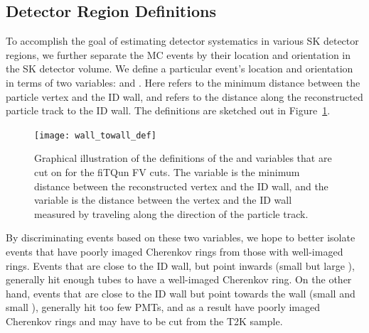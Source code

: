 \subsection{Detector Region Definitions}
\label{subsec:DR}

To accomplish the goal of estimating detector systematics in various SK
detector regions, we further separate the MC events by their location and
orientation in the SK detector volume.  We define a particular event's location
and orientation in terms of two variables: \wall and \towall.  Here \wall
refers to the minimum distance between the particle vertex and the ID wall, and
\towall refers to the distance along the reconstructed particle track to the ID
wall.  The definitions are sketched out in Figure~\ref{fig:fvdiag}.

\begin{figure}[h]
  \begin{center}
    \texttt{[image: wall\_towall\_def]}
  \end{center}
  \caption{Graphical illustration of the definitions of the \wall and \towall variables
  that are cut on for the fiTQun FV cuts.  The \wall variable is the minimum distance between
  the reconstructed vertex and the ID wall, and the \towall variable is the distance between the
  vertex and the ID wall measured by traveling along the direction of the particle track.}
  \label{fig:fvdiag}
\end{figure}

By discriminating events based on these two variables, we hope to better
isolate events that have poorly imaged Cherenkov rings from those with
well-imaged rings. Events that are close to the ID wall, but point inwards
(small \wall but large \towall), generally hit enough tubes to have a
well-imaged Cherenkov ring.  On the other hand, events that are close to the ID
wall but point towards the wall (small \wall and small \towall), generally hit
too few PMTs, and as a result have poorly imaged Cherenkov rings and may have to
be cut from the T2K sample.

